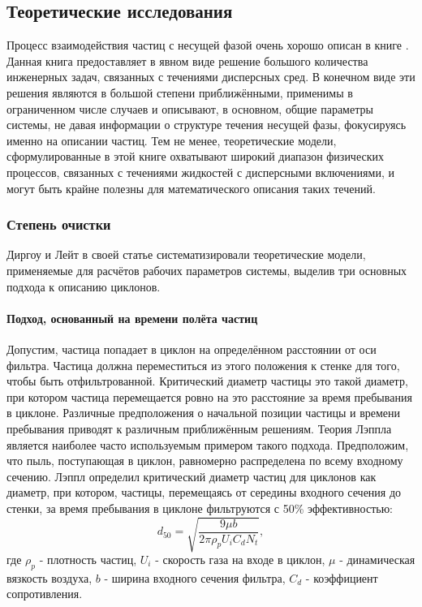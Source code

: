 	\subsection{Теоретические исследования}
		\hspace{1em}
		Процесс взаимодействия частиц с несущей фазой очень хорошо описан в книге \cite{Richardson}. Данная книга предоставляет в явном виде решение большого количества инженерных задач, связанных с течениями дисперсных сред. В конечном виде эти решения являются в большой степени приближёнными, применимы в ограниченном числе случаев и описывают, в основном, общие параметры системы, не давая информации о структуре течения несущей фазы, фокусируясь именно на описании частиц. Тем не менее, теоретические модели, сформулированные в этой книге охватывают широкий диапазон физических процессов, связанных с течениями жидкостей с дисперсными включениями, и могут быть крайне полезны для математического описания таких течений.
		\subsubsection{Степень очистки}
		Диргоу и Лейт \cite{DirgoLeith} в своей статье систематизировали теоретические модели, применяемые для расчётов рабочих параметров системы, выделив три основных подхода к описанию циклонов.
			\paragraph{Подход, основанный на времени полёта частиц\\}
			Допустим, частица попадает в циклон на определённом расстоянии от оси фильтра. Частица должна переместиться из этого положения к стенке для того, чтобы быть отфильтрованной. Критический диаметр частицы это такой диаметр, при котором частица перемещается ровно на это расстояние за время пребывания в циклоне. Различные предположения о начальной позиции частицы и времени пребывания приводят к различным приближённым решениям. Теория Лэппла \cite{Lapple} является наиболее часто используемым примером такого подхода. Предположим, что пыль, поступающая в циклон, равномерно распределена по всему входному сечению. Лэппл определил критический диаметр частиц для циклонов как диаметр, при котором, частицы, перемещаясь от середины входного сечения до стенки, за время пребывания в циклоне фильтруются с 50\% эффективностью:
			\begin{equation}
				\label{LappleEquation}
				d_{50} = \sqrt{\frac{9\mu b}{2 \pi \rho_p U_i C_d N_t}},
			\end{equation}
			где $\rho_p$ - плотность частиц, $U_i$ - скорость газа на входе в циклон, $\mu$ - динамическая вязкость воздуха, $b$ - ширина входного сечения фильтра, $C_d$ - коэффициент сопротивления.
			
